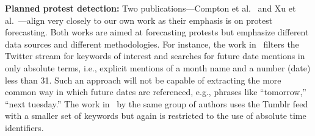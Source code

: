 {\bf Planned protest detection:}
Two publications---Compton et al.~ and Xu et al.~---align very closely to our own work as their emphasis is on protest forecasting.
Both works are aimed at forecasting protests
but emphasize different data sources and different methodologies. For instance, the work in~\cite{compton2013detecting} filters the Twitter stream for
keywords of interest and searches for future date mentions in only absolute terms, i.e., explicit mentions of a month name and a number (date)
less than 31. 
Such an approach will not be capable of extracting the more
common way in which future dates are referenced, e.g., phrases like
``tomorrow,'' ``next tuesday.'' 
The work in~\cite{xu2014civil} by the same group of authors uses the Tumblr feed with a smaller set of keywords but
again is restricted to the use of absolute time identifiers.

\iffalse
In surveying the state-of-the-art, we arrived at desiderata for a planned protest forecasting system. As shown in 
we desire a system that is capable of: i) ingesting a broad range of data sources from both popular news and social media,
ii) learning relevant phrases for tracking protests, 
iii) handling relative mentions of dates, and
iv) providing a rich representational and reasoning basis for location. 
As Table~\ref{comp-table} summarizes, current systems provide only partial solutions and the proposed
approach addresses all four desired criteria.
\fi
